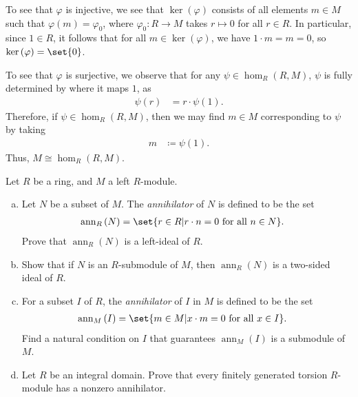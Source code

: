 \documentclass[10pt]{mypackage}
\begin{document}
\begin{solution}
\begin{enumerate}[(a)]
      To see that $\varphi$ is injective, we see that $\ker\left( \varphi \right)$ consists of all elements $m\in M$ such that $\varphi(m) = \varphi_0$, where $\varphi_0\colon R\rightarrow M$ takes $r\mapsto 0$ for all $r\in R$. In particular, since $1\in R$, it follows that for all $m\in \ker\left( \varphi \right)$, we have $1\cdot m = m = 0$, so $\ker\left( \varphi \right) = \set{0}$.\newline

      To see that $\varphi$ is surjective, we observe that for any $\psi\in \hom_{R}\left( R,M \right)$, $\psi$ is fully determined by where it maps $1$, as
      \begin{align*}
        \psi(r) &= r\cdot \psi(1).
      \end{align*}
      Therefore, if $\psi\in \hom_{R}\left( R,M \right)$, then we may find $m\in M$ corresponding to $\psi$ by taking
      \begin{align*}
        m &\coloneq \psi(1).
      \end{align*}
      Thus, $M\cong \hom_{R}\left( R,M \right)$.
  \end{enumerate}
\end{solution}
\begin{problem}[Problem 3]
  Let $R$ be a ring, and $M$ a left $R$-module.
  \begin{enumerate}[(a)]
    \item Let $N$ be a subset of $M$. The \textit{annihilator} of $N$ is defined to be the set
      \begin{align*}
        \operatorname{ann}_R\left( N \right) &= \set{r\in R | r\cdot n = 0\text{ for all }n\in N}.
      \end{align*}
      Prove that $\operatorname{ann}_R(N)$ is a left-ideal of $R$.
    \item Show that if $N$ is an $R$-submodule of $M$, then $\operatorname{ann}_R\left( N \right)$ is a two-sided ideal of $R$.
    \item For a subset $I$ of $R$, the \textit{annihilator} of $I$ in $M$ is defined to be the set
      \begin{align*}
        \operatorname{ann}_M\left( I \right) &= \set{m\in M | x\cdot m = 0\text{ for all }x\in I}.
      \end{align*}
      Find a natural condition on $I$ that guarantees $\operatorname{ann}_M(I)$ is a submodule of $M$.
    \item Let $R$ be an integral domain. Prove that every finitely generated torsion $R$-module has a nonzero annihilator.
  \end{enumerate}
\end{problem}
\end{document}
